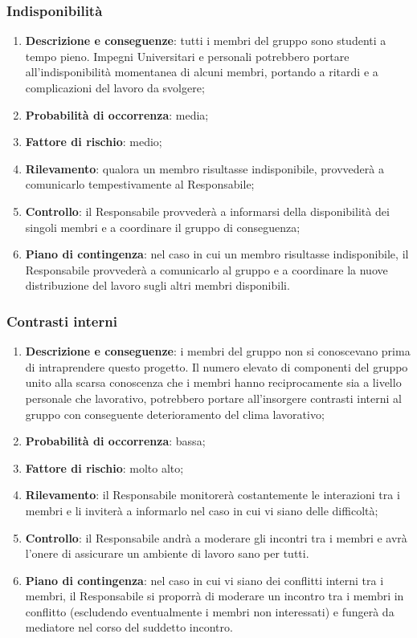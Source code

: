 	\subsubsection{Indisponibilità}
	\begin{enumerate}
		\item \textbf{Descrizione e conseguenze}: tutti i membri del gruppo sono studenti a tempo pieno. Impegni Universitari e personali potrebbero portare all'indisponibilità momentanea di alcuni membri, portando a ritardi e a complicazioni del lavoro da svolgere; 
		\item \textbf{Probabilità di occorrenza}: media;
		\item \textbf{Fattore di rischio}: medio;
		\item \textbf{Rilevamento}: qualora un membro risultasse indisponibile, provvederà a comunicarlo tempestivamente al Responsabile;
		\item \textbf{Controllo}: il Responsabile provvederà a informarsi della disponibilità dei singoli membri e a coordinare il gruppo di conseguenza;
		\item \textbf{Piano di contingenza}: nel caso in cui un membro risultasse indisponibile, il Responsabile provvederà a comunicarlo al gruppo e a coordinare la nuove distribuzione del lavoro sugli altri membri disponibili.
	\end{enumerate}
	
	\subsubsection{Contrasti interni}
	\begin{enumerate}
		\item \textbf{Descrizione e conseguenze}: i membri del gruppo non si conoscevano prima di intraprendere questo progetto. Il numero elevato di componenti del gruppo unito alla scarsa conoscenza che i membri hanno reciprocamente sia a livello personale che lavorativo, potrebbero portare all'insorgere contrasti interni al gruppo con conseguente deterioramento del clima lavorativo;
		\item \textbf{Probabilità di occorrenza}: bassa;
		\item \textbf{Fattore di rischio}: molto alto;
		\item \textbf{Rilevamento}: il Responsabile monitorerà costantemente le interazioni tra i membri e li inviterà a informarlo nel caso in cui vi siano delle difficoltà;
		\item \textbf{Controllo}: il Responsabile andrà a moderare gli incontri tra i membri e avrà l'onere di assicurare un ambiente di lavoro sano per tutti. 
		\item \textbf{Piano di contingenza}: nel caso in cui vi siano dei conflitti interni tra i membri, il Responsabile si proporrà di moderare un incontro tra i membri in conflitto (escludendo eventualmente i membri non interessati) e fungerà da mediatore nel corso del suddetto incontro.
	\end{enumerate}
	
